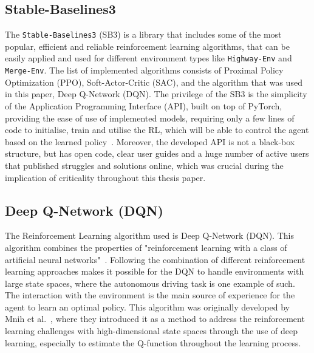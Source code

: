 \subsection{Stable-Baselines3}

The \texttt{Stable-Baselines3} (SB3) is a library that includes some of the most popular, efficient and reliable reinforcement learning algorithms, that can be easily applied and used for different environment types like \texttt{Highway-Env} and \texttt{Merge-Env}. The list of implemented algorithms consists of Proximal Policy Optimization (PPO), Soft-Actor-Critic (SAC), and the algorithm that was used in this paper, Deep Q-Network (DQN). The privilege of the SB3 is the simplicity of the Application Programming Interface (API), built on top of PyTorch, providing the ease of use of implemented models, requiring only a few lines of code to initialise, train and utilise the RL, which will be able to control the agent based on the learned policy~\cite{raffin2021stable}. Moreover, the developed API is not a black-box structure, but has open code, clear user guides and a huge number of active users that published struggles and solutions online, which was crucial during the implication of criticality throughout this thesis paper.

\subsection{Deep Q-Network (DQN)}

The Reinforcement Learning algorithm used is Deep Q-Network (DQN). This algorithm combines the properties of "reinforcement learning with a class of artificial neural networks"~\cite{mnih2015human}. Following the combination of different reinforcement learning approaches makes it possible for the DQN to handle environments with large state spaces, where the autonomous driving task is one example of such. The interaction with the environment is the main source of experience for the agent to learn an optimal policy. This algorithm was originally developed by Mnih et al.~\cite{mnih2015human}, where they introduced it as a method to address the reinforcement learning challenges with high-dimensional state spaces through the use of deep learning, especially to estimate the Q-function throughout the learning process.

